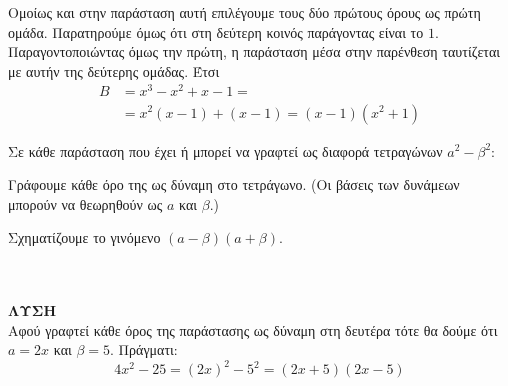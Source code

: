 \begin{rlist}
\item Ομοίως και στην παράσταση αυτή επιλέγουμε τους δύο πρώτους όρους ως πρώτη ομάδα. Παρατηρούμε όμως ότι στη δεύτερη κοινός παράγοντας είναι το $ 1 $. Παραγοντοποιώντας όμως την πρώτη, η παράσταση μέσα στην παρένθεση ταυτίζεται με αυτήν της δεύτερης ομάδας. Έτσι
\begin{align*}
B&=x^3-x^2+x-1=\\&=x^2(x-1)+(x-1)=(x-1)\left( x^2+1\right)
\end{align*}
\end{rlist}
\begin{Methodos}{8cm}
Σε κάθε παράσταση που έχει ή μπορεί να γραφτεί ως διαφορά τετραγώνων $ a^2-\beta^2 $:
\begin{bhma}
\item Γράφουμε κάθε όρο της ως δύναμη στο τετράγωνο. (Οι βάσεις των δυνάμεων μπορούν να θεωρηθούν ως $ a $ και $ \beta $.)
\item Σχηματίζουμε το γινόμενο $ (a-\beta)(a+\beta) $.
\end{bhma}
\end{Methodos}
\\\\
\textbf{ΛΥΣΗ}\\
Αφού γραφτεί κάθε όρος της παράστασης ως δύναμη στη δευτέρα τότε θα δούμε ότι $ a=2x $ και $ \beta=5 $. Πράγματι:
\[ 4x^2-25=(2x)^2-5^2=(2x+5)(2x-5) \]
